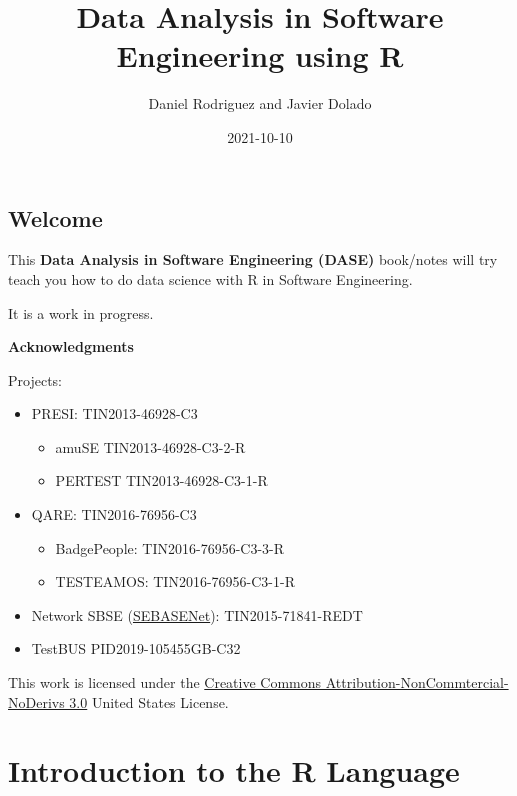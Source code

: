 \documentclass[
]{book}
\title{Data Analysis in Software Engineering using R}
\author{Daniel Rodriguez and Javier Dolado}
\date{2021-10-10}
\providecommand{\tightlist}{%
  \setlength{\itemsep}{0pt}\setlength{\parskip}{0pt}}
\begin{document}
\maketitle

{
\setcounter{tocdepth}{1}
\tableofcontents
}
\hypertarget{welcome}{%
\chapter*{Welcome}\label{welcome}}

This \textbf{Data Analysis in Software Engineering (DASE)} book/notes will try teach you how to do data science with R in Software Engineering.

It is a work in progress.

\textbf{Acknowledgments}

Projects:

\begin{itemize}
\item
  PRESI: TIN2013-46928-C3

  \begin{itemize}
  \tightlist
  \item
    amuSE TIN2013-46928-C3-2-R
  \item
    PERTEST TIN2013-46928-C3-1-R
  \end{itemize}
\item
  QARE: TIN2016-76956-C3

  \begin{itemize}
  \tightlist
  \item
    BadgePeople: TIN2016-76956-C3-3-R
  \item
    TESTEAMOS: TIN2016-76956-C3-1-R
  \end{itemize}
\item
  Network SBSE (\href{https://www.uco.es/investigacion/proyectos/SEBASENet/index.php?title=P\%C3\%A1gina_principal}{SEBASENet}): TIN2015-71841-REDT
\item
  TestBUS PID2019-105455GB-C32
\end{itemize}

This work is licensed under the \href{http://creativecommons.org/licenses/by-nc-nd/3.0/us/}{Creative Commons Attribution-NonCommtercial-NoDerivs 3.0} United States License.

\hypertarget{part-introduction-to-the-r-language}{%
\part{Introduction to the R Language}\label{part-introduction-to-the-r-language}}
\end{document}
